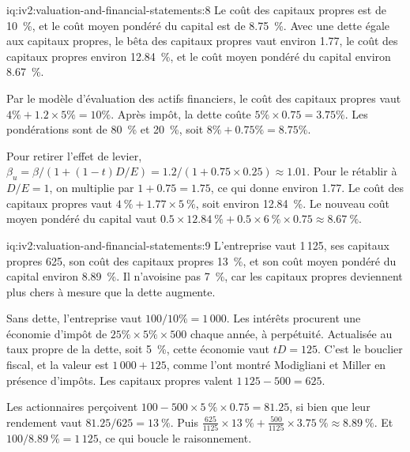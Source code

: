 \begin{solution}{iq:iv2:valuation-and-financial-statements:8}
Le coût des capitaux propres est de 10~\%, et le coût moyen pondéré du capital est de 8.75~\%. Avec une dette égale aux capitaux propres, le bêta des capitaux propres vaut environ 1.77, le coût des capitaux propres environ 12.84~\%, et le coût moyen pondéré du capital environ 8.67~\%.

Par le modèle d'évaluation des actifs financiers, le coût des capitaux propres vaut $4\% + 1.2 \times 5\% = 10\%$. Après impôt, la dette coûte $5\% \times 0.75 = 3.75\%$. Les pondérations sont de 80~\% et 20~\%, soit $8\% + 0.75\% = 8.75\%$.

Pour retirer l'effet de levier, $\beta_u = \beta / \left(1 + (1 - t)D/E\right) = 1.2/(1 + 0.75 \times 0.25) \approx 1.01$. Pour le rétablir à $D/E = 1$, on multiplie par $1 + 0.75 = 1.75$, ce qui donne environ 1.77. Le coût des capitaux propres vaut $4~\% + 1.77 \times 5~\%$, soit environ 12.84~\%. Le nouveau coût moyen pondéré du capital vaut $0.5 \times 12.84~\% + 0.5 \times 6~\% \times 0.75 \approx 8.67~\%$.

\end{solution}

\begin{solution}{iq:iv2:valuation-and-financial-statements:9}
L'entreprise vaut 1\,125, ses capitaux propres 625, son coût des capitaux propres 13~\%, et son coût moyen pondéré du capital environ 8.89~\%. Il n'avoisine pas 7~\%, car les capitaux propres deviennent plus chers à mesure que la dette augmente.

Sans dette, l'entreprise vaut $100/10\% = 1\,000$. Les intérêts procurent une économie d'impôt de $25\% \times 5\% \times 500$ chaque année, à perpétuité. Actualisée au taux propre de la dette, soit 5~\%, cette économie vaut $tD = 125$. C'est le bouclier fiscal, et la valeur est $1\,000 + 125$, comme l'ont montré Modigliani et Miller en présence d'impôts. Les capitaux propres valent $1\,125 - 500 = 625$.

Les actionnaires perçoivent $100 - 500 \times 5~\% \times 0.75 = 81.25$, si bien que leur rendement vaut $81.25/625 = 13~\%$. Puis $\tfrac{625}{1125} \times 13~\% + \tfrac{500}{1125} \times 3.75~\% \approx 8.89~\%$. Et $100/8.89~\% = 1\,125$, ce qui boucle le raisonnement.

\end{solution}

